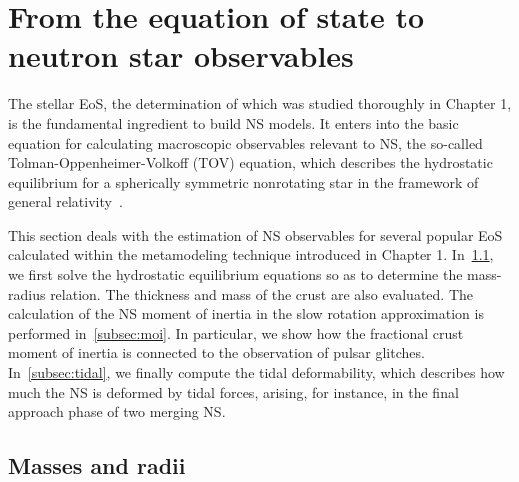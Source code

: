 \minitoc\newpage

\section{From the equation of state to neutron star observables}\label{sec:tov}

The stellar EoS, the determination of which was studied thoroughly in Chapter 
1, is the fundamental ingredient to build NS models. It enters into the 
basic equation for calculating macroscopic observables relevant to NS, the 
so-called Tolman-Oppenheimer-Volkoff (TOV) equation, which describes the 
hydrostatic equilibrium for a spherically symmetric nonrotating star in the 
framework of general relativity~\cite{Tolman1939,Oppenheimer1939}.

This section deals with the estimation of NS observables for several 
popular EoS calculated within the metamodeling technique introduced in 
Chapter 1. In~\ref{subsec:masses}, we first solve the hydrostatic 
equilibrium equations so as to determine the mass-radius relation. The 
thickness and mass of the crust are also evaluated. The calculation of the NS 
moment of inertia in the slow rotation approximation is performed 
in~\ref{subsec:moi}. In particular, we show how the fractional crust moment 
of inertia is connected to the 
observation of pulsar glitches. In~\ref{subsec:tidal}, we finally compute the 
tidal deformability, which describes how much the NS is deformed by tidal 
forces, arising, for instance, in the final approach phase of two merging NS.

\subsection{Masses and radii}\label{subsec:masses}

